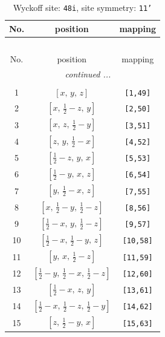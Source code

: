\documentclass[fleqn,8pt]{jsarticle}
\begin{document}
\renewcommand{\arraystretch}{1.2}
\begin{longtable}{ccc}
\caption{Wyckoff site: {\tt 48i}, site symmetry: {\tt 11'}}
 \\
 \hline \hline
No. & position & mapping \\ \hline \endfirsthead

\multicolumn{2}{l}{\tablename\ \thetable{}} \\
 \hline \hline
No. & position & mapping \\ \hline \endhead

 \hline \hline
\multicolumn{2}{r}{\footnotesize\it continued ...} \\ \endfoot

 \hline \hline
\multicolumn{2}{r}{} \\ \endlastfoot

1 & $\left[ x,\, y,\, z \right]$ & {\tt [1,49]} \\ \hline
2 & $\left[ x,\, \frac{1}{2} - z,\, y \right]$ & {\tt [2,50]} \\ \hline
3 & $\left[ x,\, z,\, \frac{1}{2} - y \right]$ & {\tt [3,51]} \\ \hline
4 & $\left[ z,\, y,\, \frac{1}{2} - x \right]$ & {\tt [4,52]} \\ \hline
5 & $\left[ \frac{1}{2} - z,\, y,\, x \right]$ & {\tt [5,53]} \\ \hline
6 & $\left[ \frac{1}{2} - y,\, x,\, z \right]$ & {\tt [6,54]} \\ \hline
7 & $\left[ y,\, \frac{1}{2} - x,\, z \right]$ & {\tt [7,55]} \\ \hline
8 & $\left[ x,\, \frac{1}{2} - y,\, \frac{1}{2} - z \right]$ & {\tt [8,56]} \\ \hline
9 & $\left[ \frac{1}{2} - x,\, y,\, \frac{1}{2} - z \right]$ & {\tt [9,57]} \\ \hline
10 & $\left[ \frac{1}{2} - x,\, \frac{1}{2} - y,\, z \right]$ & {\tt [10,58]} \\ \hline
11 & $\left[ y,\, x,\, \frac{1}{2} - z \right]$ & {\tt [11,59]} \\ \hline
12 & $\left[ \frac{1}{2} - y,\, \frac{1}{2} - x,\, \frac{1}{2} - z \right]$ & {\tt [12,60]} \\ \hline
13 & $\left[ \frac{1}{2} - x,\, z,\, y \right]$ & {\tt [13,61]} \\ \hline
14 & $\left[ \frac{1}{2} - x,\, \frac{1}{2} - z,\, \frac{1}{2} - y \right]$ & {\tt [14,62]} \\ \hline
15 & $\left[ z,\, \frac{1}{2} - y,\, x \right]$ & {\tt [15,63]} \\ \hline

\end{longtable}
\end{document}

